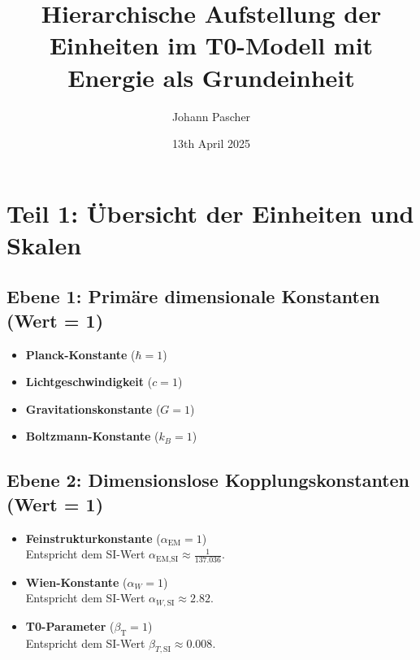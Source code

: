 \documentclass[12pt,a4paper]{article}
\newcommand{\alphaEM}{\alpha_{\text{EM}}}
\newcommand{\betaT}{\beta_{\text{T}}}
\newcommand{\alphaEMSI}{\alpha_{\text{EM,SI}}}
\begin{document}
	
	\title{Hierarchische Aufstellung der Einheiten im T0-Modell mit Energie als Grundeinheit}
	\author{Johann Pascher}
	\date{13th April 2025}
	\maketitle
	
	\section*{Teil 1: Übersicht der Einheiten und Skalen}
	
	\subsection*{Ebene 1: Primäre dimensionale Konstanten (Wert = 1)}
	\begin{itemize}[itemsep=0.5em]
		\item \textbf{Planck-Konstante} ($\hbar = 1$)
		\item \textbf{Lichtgeschwindigkeit} ($c = 1$)
		\item \textbf{Gravitationskonstante} ($G = 1$)
		\item \textbf{Boltzmann-Konstante} ($k_B = 1$)
	\end{itemize}
	
	\subsection*{Ebene 2: Dimensionslose Kopplungskonstanten (Wert = 1)}
	\begin{itemize}[itemsep=0.5em]
		\item \textbf{Feinstrukturkonstante} (\(\alphaEM = 1\)) \\
		Entspricht dem SI-Wert \(\alphaEMSI \approx \frac{1}{137.036}\).
		\item \textbf{Wien-Konstante} (\(\alpha_W = 1\)) \\
		Entspricht dem SI-Wert \(\alpha_{W,\mathrm{SI}} \approx 2.82\).
		\item \textbf{T0-Parameter} (\(\betaT = 1\)) \\
		Entspricht dem SI-Wert \(\beta_{T,\mathrm{SI}} \approx 0.008\).
	\end{itemize}
	
\end{document}
